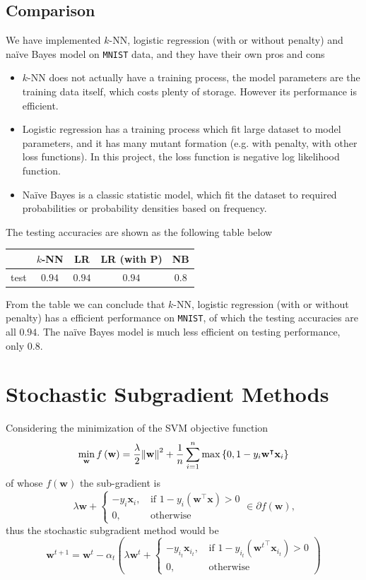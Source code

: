 \documentclass[10pt]{article}
\begin{document}
\subsection{Comparison}
We have implemented $k$-NN, logistic regression (with or without penalty) and naïve Bayes model on \texttt{MNIST} data, and they have their own pros and cons
\begin{itemize}
\item $k$-NN \cite{keller1985fuzzy} does not actually have a training process, the model parameters are the training data itself, which costs plenty of storage. However its performance is efficient.
\item Logistic regression \cite{hosmer2013applied} has a training process which fit large dataset to model parameters, and it has many mutant formation (e.g. with penalty, with other loss functions). In this project, the loss function is negative log likelihood function.
\item Naïve Bayes \cite{mccallum1998comparison} is a classic statistic model, which fit the dataset to required probabilities or probability densities based on frequency.
\end{itemize}
The testing accuracies are shown as the following table below
\begin{center}
\begin{tabular}{|c|c|c|c|c|}
\hline
 & $k$-NN & LR & LR (with P) & NB\\
\hline
test & $0.94$ & $0.94$ & $0.94$ & $0.8$ \\
\hline
\end{tabular}
\end{center}
From the table we can conclude that $k$-NN, logistic regression (with or without penalty) has a efficient performance on \texttt{MNIST}, of which the testing accuracies are all $0.94$. The naïve Bayes model is much less efficient on testing performance, only $0.8$.
\section{Stochastic Subgradient Methods}
Considering the minimization of the SVM objective function
$$
\min_{\mathbf{w}}f\left(\mathbf{w}\right) = \dfrac\lambda2\norm{\mathbf{w}}^2 + \dfrac1n\sum\limits_{i=1}^n\max\left\{0, 1 - y_i\mathbf{w}^\intercal\mathbf{x}_i\right\}
$$
of whose $f\left(\mathbf{w}\right)$ the sub-gradient is
$$
\lambda\mathbf{w} + \begin{cases}
-y_i\mathbf{x}_i, &\, \text{if } 1 - y_i\left(\mathbf{w}^\intercal\mathbf{x}\right) > 0 \\
0, &\, \text{otherwise}
\end{cases} \in \partial f\left(\mathbf{w}\right)\text{,}
$$
thus the stochastic subgradient method would be
$$
\mathbf{w}^{t+1} = \mathbf{w}^t - \alpha_t\left(\lambda\mathbf{w}^t + \begin{cases}
-y_{i_t}\mathbf{x}_{i_t}, &\, \text{if } 1 - y_{i_t}\left({\mathbf{w}^t}^\intercal\mathbf{x}_{i_t}\right) > 0 \\
0, &\, \text{otherwise}
\end{cases}\right)
$$
\end{document}
